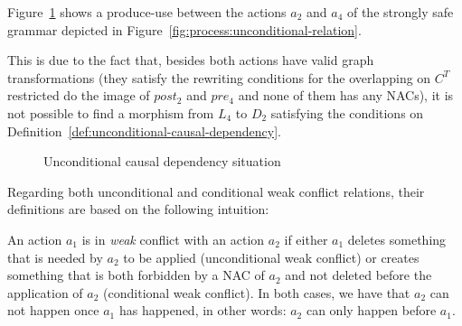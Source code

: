 \begin{example}Figure~\ref{fig:process:unconditional-relation:dependency} shows a produce-use between the actions $a_2$ and $a_4$ of the strongly safe grammar depicted in Figure~\ref{fig:process:unconditional-relation}.

  This is due to the fact that, besides both actions have valid graph transformations (they satisfy the rewriting conditions for the overlapping on $C^T$ restricted do the image of $post_2$ and $pre_4$ and none of them has any NACs), it is not possible to find a morphism from $L_4$ to $D_2$ satisfying the conditions on Definition~\ref{def:unconditional-causal-dependency}.

\begin{figure}[!ht]
  \centering
  \caption{Unconditional causal dependency situation}\label{fig:process:unconditional-relation:dependency}
\end{figure}
\end{example}

Regarding both unconditional and conditional weak conflict relations, their definitions are based on the following intuition:

  \begin{intuition} An action $a_1$ is in \emph{weak} conflict with an action $a_2$ if either $a_1$ deletes something that is needed by $a_2$ to be applied (unconditional weak conflict) or creates something that is both forbidden by a NAC of $a_2$ and not deleted before the application of $a_2$ (conditional weak conflict). In both cases, we have that $a_2$ can not happen once $a_1$ has happened, in other words: $a_2$ can only happen before $a_1$.
\end{intuition}


